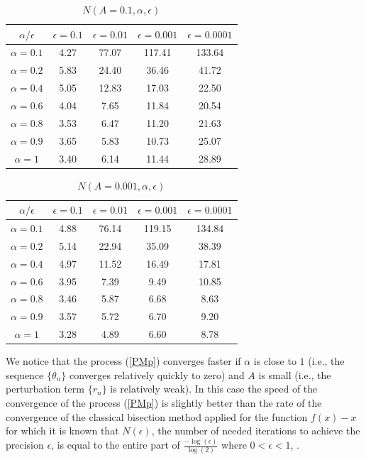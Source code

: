 \documentclass[11pt]{amsart}%
\theoremstyle{plain}
\numberwithin{equation}{section}
\begin{document}
\begin{table}[h]
\centering
\begin{tabular}{ccccc}
\hline\hline
$\alpha/\epsilon $ & $\epsilon=0.1 $ & $\epsilon=0.01 $& $\epsilon=0.001 $& $\epsilon=0.0001 $\\ [0.5ex]
\hline
$\alpha=0.1$ & 4.27&77.07&117.41&133.64 \\
$\alpha=0.2$ & 5.83&24.40&36.46&41.72 \\
$\alpha=0.4$ & 5.05&12.83&17.03&22.50 \\
$\alpha=0.6$ & 4.04&7.65&11.84&20.54 \\
$\alpha=0.8$ & 3.53&6.47&11.20&21.63 \\
$\alpha=0.9$ & 3.65&5.83&10.73&25.07 \\
$\alpha=1$   & 3.40&6.14& 11.44& 28.89\\ [1ex]
\end{tabular}
\caption{$N(A=0.1,\alpha,\epsilon)$}
\end{table}
\begin{table}[h]
\centering
\begin{tabular}{ccccc}
\hline\hline
$\alpha/\epsilon $ & $\epsilon=0.1 $ & $\epsilon=0.01 $& $\epsilon=0.001 $& $\epsilon=0.0001 $\\ [0.5ex]
\hline
$\alpha=0.1$ & 4.88&76.14&119.15&134.84 \\
$\alpha=0.2$ & 5.14&22.94&35.09&38.39 \\
$\alpha=0.4$ & 4.97&11.52&16.49&17.81 \\
$\alpha=0.6$ & 3.95&7.39&9.49& 10.85\\
$\alpha=0.8$ & 3.46&5.87&6.68&8.63 \\
$\alpha=0.9$ & 3.57&5.72&6.70&9.20 \\
$\alpha=1$   & 3.28&4.89& 6.60& 8.78\\ [1ex]
\end{tabular}
\caption{$N(A=0.001,\alpha,\epsilon)$}
\end{table}
We notice that the process (\ref{PMp}) converges faster if $\alpha$ is close to $1$ (i.e., the sequence $\{\theta_n\}$ converges relatively quickly to zero) and $A$ is small (i.e., the perturbation term $\{r_n\}$ is relatively weak). In this case the speed of the convergence of the process (\ref{PMp}) is slightly better than the rate of the convergence of the classical bisection method applied for the function $f(x)-x$  for which it is known that  $N(\epsilon)$, the number of needed iterations to achieve the precision $\epsilon$,  is equal to the entire part of  $\frac{-\log(\epsilon)}{\log(2)}$ where $0<\epsilon<1$, \cite{Con}.
\end{document}
